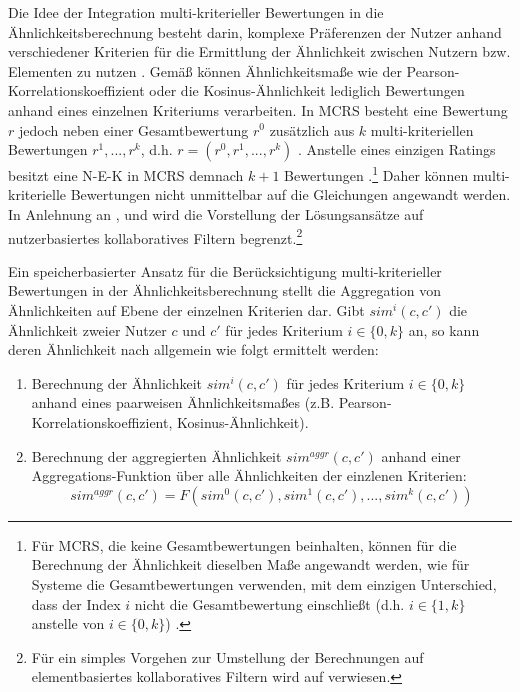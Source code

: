 Die Idee der Integration multi-kriterieller Bewertungen in die Ähnlichkeitsberechnung besteht darin, komplexe Präferenzen der Nutzer anhand verschiedener Kriterien für die Ermittlung der Ähnlichkeit zwischen Nutzern bzw. Elementen zu nutzen \cite[S. 676]{jannach:2:article}. 
Gemäß \textcite[S. 856f.]{adomavicius:4:inbook} können Ähnlichkeitsmaße wie der Pearson-Korrelationskoeffizient oder die Kosinus-Ähnlichkeit lediglich Bewertungen anhand eines einzelnen Kriteriums verarbeiten.
In \ac{MCRS} besteht eine Bewertung $r$ jedoch neben einer Gesamtbewertung $r^{0}$ zusätzlich aus $k$ multi-kriteriellen Bewertungen $r^{1}, ..., r^{k}$, d.h. $r=(r^{0},r^{1}, ..., r^{k})$ \cite[S. 426]{recommenderSystems:2016}\cite[S. 857]{adomavicius:4:inbook}.
Anstelle eines einzigen Ratings besitzt eine \ac{N-E-K} in \ac{MCRS} demnach $k+1$ Bewertungen \cite[S. 857]{adomavicius:4:inbook}.\footnote{Für \ac{MCRS}, die keine Gesamtbewertungen beinhalten, können für die Berechnung der Ähnlichkeit dieselben Maße angewandt werden, wie für Systeme die Gesamtbewertungen verwenden, mit dem einzigen Unterschied, dass der Index $i$ nicht die Gesamtbewertung einschließt (d.h. $i \in \{1,k\}$ anstelle von $i \in \{0,k\}$) \cite[S. 857]{adomavicius:4:inbook}.}
Daher können multi-kriterielle Bewertungen nicht unmittelbar auf die Gleichungen angewandt werden.
In Anlehnung an \textcite[S. 49]{adomavicius:inproceedings:2}, \textcite[S. 860]{adomavicius:4:inbook} und \textcite[S. 427]{recommenderSystems:2016} wird die Vorstellung der Lösungsansätze auf nutzerbasiertes kollaboratives Filtern begrenzt.\footnote{Für ein simples Vorgehen zur Umstellung der Berechnungen auf elementbasiertes kollaboratives Filtern wird auf \textcite[S. 49]{adomavicius:inproceedings:2} verwiesen.}

Ein speicherbasierter Ansatz für die Berücksichtigung multi-kriterieller Bewertungen in der Ähnlichkeitsberechnung stellt die Aggregation von Ähnlichkeiten auf Ebene der einzelnen Kriterien dar.
Gibt $sim^{i}(c,c')$ die Ähnlichkeit zweier Nutzer $c$ und $c'$ für jedes Kriterium $i \in \{0,k\}$ an, so kann deren Ähnlichkeit nach \textcite[S. 427]{recommenderSystems:2016} allgemein wie folgt ermittelt werden:
\begin{enumerate}
    \item Berechnung der Ähnlichkeit $sim^{i}(c,c')$ für jedes Kriterium $i \in \{0,k\}$ anhand eines paarweisen Ähnlichkeitsmaßes (z.B. Pearson-Korrelations\-koeffizient, Kosinus-Ähnlichkeit).
    \item Berechnung der aggregierten Ähnlichkeit $sim^{aggr}(c,c')$ anhand einer Aggregations-Funktion über alle Ähnlichkeiten der einzlenen Kriterien:
    \begin{equation}
        sim^{aggr}(c,c') = F(sim^{0}(c,c'), sim^{1}(c,c'), ..., sim^{k}(c,c'))
    \end{equation}
\end{enumerate}

